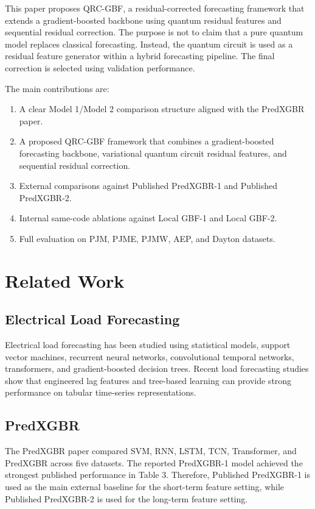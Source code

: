 \documentclass[11pt]{article}
\begin{document}
This paper proposes QRC-GBF, a residual-corrected forecasting framework that extends a gradient-boosted backbone using quantum residual features and sequential residual correction. The purpose is not to claim that a pure quantum model replaces classical forecasting. Instead, the quantum circuit is used as a residual feature generator within a hybrid forecasting pipeline. The final correction is selected using validation performance.

The main contributions are:
\begin{enumerate}
    \item A clear Model 1/Model 2 comparison structure aligned with the PredXGBR paper.
    \item A proposed QRC-GBF framework that combines a gradient-boosted forecasting backbone, variational quantum circuit residual features, and sequential residual correction.
    \item External comparisons against Published PredXGBR-1 and Published PredXGBR-2.
    \item Internal same-code ablations against Local GBF-1 and Local GBF-2.
    \item Full evaluation on PJM, PJME, PJMW, AEP, and Dayton datasets.
\end{enumerate}

\section{Related Work}
\subsection{Electrical Load Forecasting}
Electrical load forecasting has been studied using statistical models, support vector machines, recurrent neural networks, convolutional temporal networks, transformers, and gradient-boosted decision trees. Recent load forecasting studies show that engineered lag features and tree-based learning can provide strong performance on tabular time-series representations.

\subsection{PredXGBR}
The PredXGBR paper compared SVM, RNN, LSTM, TCN, Transformer, and PredXGBR across five datasets. The reported PredXGBR-1 model achieved the strongest published performance in Table 3. Therefore, Published PredXGBR-1 is used as the main external baseline for the short-term feature setting, while Published PredXGBR-2 is used for the long-term feature setting.
\end{document}
